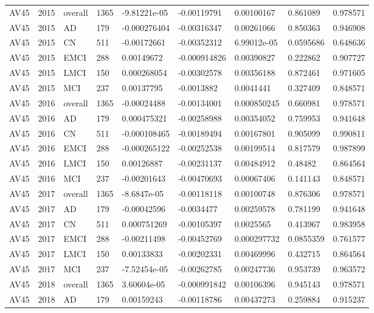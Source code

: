 \begin{landscape}
\begin{longtable}{lllllllll}
AV45 & 2015 & overall & 1365 & -9.81221e-05 & -0.00119791 & 0.00100167 & 0.861089 & 0.978571 \\
AV45 & 2015 & AD & 179 & -0.000276404 & -0.00316347 & 0.00261066 & 0.850363 & 0.946908 \\
AV45 & 2015 & CN & 511 & -0.00172661 & -0.00352312 & 6.99012e-05 & 0.0595686 & 0.648636 \\
AV45 & 2015 & EMCI & 288 & 0.00149672 & -0.000914826 & 0.00390827 & 0.222862 & 0.907727 \\
AV45 & 2015 & LMCI & 150 & 0.000268054 & -0.00302578 & 0.00356188 & 0.872461 & 0.971605 \\
AV45 & 2015 & MCI & 237 & 0.00137795 & -0.0013882 & 0.0041441 & 0.327409 & 0.848571 \\
AV45 & 2016 & overall & 1365 & -0.00024488 & -0.00134001 & 0.000850245 & 0.660981 & 0.978571 \\
AV45 & 2016 & AD & 179 & 0.000475321 & -0.00258988 & 0.00354052 & 0.759953 & 0.941648 \\
AV45 & 2016 & CN & 511 & -0.000108465 & -0.00189494 & 0.00167801 & 0.905099 & 0.990811 \\
AV45 & 2016 & EMCI & 288 & -0.000265122 & -0.00252538 & 0.00199514 & 0.817579 & 0.987899 \\
AV45 & 2016 & LMCI & 150 & 0.00126887 & -0.00231137 & 0.00484912 & 0.48482 & 0.864564 \\
AV45 & 2016 & MCI & 237 & -0.00201643 & -0.00470693 & 0.00067406 & 0.141143 & 0.848571 \\
AV45 & 2017 & overall & 1365 & -8.6847e-05 & -0.00118118 & 0.00100748 & 0.876306 & 0.978571 \\
AV45 & 2017 & AD & 179 & -0.00042596 & -0.0034477 & 0.00259578 & 0.781199 & 0.941648 \\
AV45 & 2017 & CN & 511 & 0.000751269 & -0.00105397 & 0.0025565 & 0.413967 & 0.983958 \\
AV45 & 2017 & EMCI & 288 & -0.00211498 & -0.00452769 & 0.000297732 & 0.0855359 & 0.761577 \\
AV45 & 2017 & LMCI & 150 & 0.00133833 & -0.00202331 & 0.00469996 & 0.432715 & 0.864564 \\
AV45 & 2017 & MCI & 237 & -7.52454e-05 & -0.00262785 & 0.00247736 & 0.953739 & 0.963572 \\
AV45 & 2018 & overall & 1365 & 3.60604e-05 & -0.000991842 & 0.00106396 & 0.945143 & 0.978571 \\
AV45 & 2018 & AD & 179 & 0.00159243 & -0.00118786 & 0.00437273 & 0.259884 & 0.915237 \\

\end{longtable}
\end{landscape}

